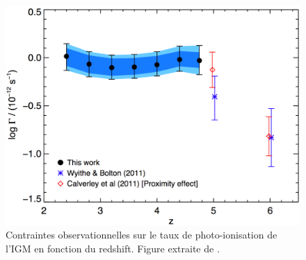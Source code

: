 \begin{figure}
        \includegraphics[width=.95\linewidth]{img/01/photon_obs.pdf} 
        \caption[Taux de photo-ionisation ]{Contraintes observationnelles sur le taux de photo-ionisation de l'\ac{IGM} en fonction du redshift. 
        Figure extraite de \cite{2013MNRAS.436.1023B}.
 		\label{fig:photoionisationrate}}
\end{figure}





%
%
%


%
%

%
%

